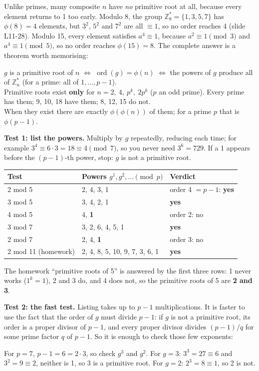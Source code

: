 Unlike primes, many composite $n$ have \emph{no} primitive root at all, because every element returns to 1 too early. Modulo 8, the group $\mathbb{Z}_8^* = \{1, 3, 5, 7\}$ has $\phi(8) = 4$ elements, but $3^2$, $5^2$ and $7^2$ are all $\equiv 1$, so no order reaches 4 (slide L11-28). Modulo 15, every element satisfies $a^4 \equiv 1$, because $a^2 \equiv 1 \pmod 3$ and $a^4 \equiv 1 \pmod 5$, so no order reaches $\phi(15) = 8$. The complete answer is a theorem worth memorising:

\begin{mustknow}
$g$ is a primitive root of $n$ $\iff$ $\operatorname{ord}(g) = \phi(n)$ $\iff$ the powers of $g$ produce all of $\mathbb{Z}_n^*$ (for a prime: all of $1, \dots, p-1$).\\
Primitive roots exist \textbf{only} for $n = 2,\ 4,\ p^k,\ 2p^k$ ($p$ an odd prime). Every prime has them; 9, 10, 18 have them; 8, 12, 15 do not.\\
When they exist there are exactly $\phi(\phi(n))$ of them; for a prime $p$ that is $\phi(p-1)$.
\end{mustknow}

\textbf{Test 1: list the powers.} Multiply by $g$ repeatedly, reducing each time; for example $3^4 \equiv 6 \cdot 3 = 18 \equiv 4 \pmod 7$, so you never need $3^6 = 729$. If a 1 appears before the $(p-1)$-th power, stop: $g$ is not a primitive root.
\begin{center}\small
\begin{tabular}{@{}lll@{}}
\toprule
Test & Powers $g^1, g^2, \dots \pmod p$ & Verdict\\
\midrule
2 mod 5 & 2, 4, 3, 1 & order 4 $= p - 1$: \textbf{yes}\\
3 mod 5 & 3, 4, 2, 1 & \textbf{yes}\\
4 mod 5 & 4, \textbf{1} & order 2: no\\
3 mod 7 & 3, 2, 6, 4, 5, 1 & \textbf{yes}\\
2 mod 7 & 2, 4, \textbf{1} & order 3: no\\
2 mod 11 (homework) & 2, 4, 8, 5, 10, 9, 7, 3, 6, 1 & \textbf{yes}\\
\bottomrule
\end{tabular}
\end{center}
The homework ``primitive roots of 5'' is answered by the first three rows: 1 never works ($1^k = 1$), 2 and 3 do, and 4 does not, so the primitive roots of 5 are \textbf{2 and 3}.

\textbf{Test 2: the fast test.} Listing takes up to $p - 1$ multiplications. It is faster to use the fact that the order of $g$ must divide $p - 1$: if $g$ is not a primitive root, its order is a proper divisor of $p - 1$, and every proper divisor divides $(p-1)/q$ for some prime factor $q$ of $p - 1$. So it is enough to check those few exponents:
\begin{center}
\end{center}
For $p = 7$, $p - 1 = 6 = 2 \cdot 3$, so check $g^3$ and $g^2$. For $g = 3$: $3^3 = 27 \equiv 6$ and $3^2 = 9 \equiv 2$, neither is 1, so 3 is a primitive root. For $g = 2$: $2^3 = 8 \equiv 1$, so 2 is not.

